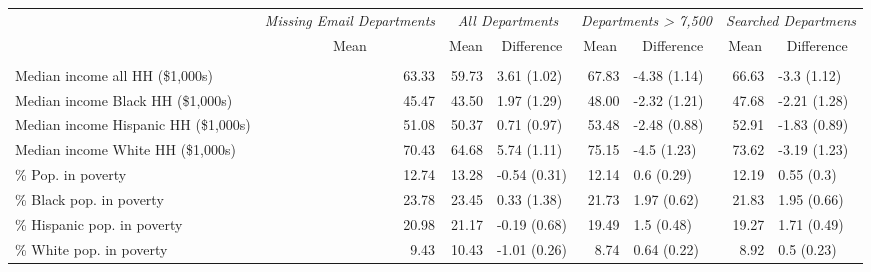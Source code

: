 \begin{table}
\centering
\begin{tabular}[t]{lrrlrlrl}
\toprule
\multicolumn{1}{c}{\em{}} & \multicolumn{1}{c}{\em{Missing Email Departments}} & \multicolumn{2}{c}{\em{All Departments}} & \multicolumn{2}{c}{\em{Departments > 7,500}} & \multicolumn{2}{c}{\em{Searched Departmens}} \\
\cmidrule(l{3pt}r{3pt}){2-2} \cmidrule(l{3pt}r{3pt}){3-4} \cmidrule(l{3pt}r{3pt}){5-6} \cmidrule(l{3pt}r{3pt}){7-8}
\multicolumn{1}{c}{} & \multicolumn{1}{c}{Mean} & \multicolumn{1}{c}{Mean} & \multicolumn{1}{c}{Difference} & \multicolumn{1}{c}{Mean} & \multicolumn{1}{c}{Difference} & \multicolumn{1}{c}{Mean} & \multicolumn{1}{c}{Difference} \\
\cmidrule(l{3pt}r{3pt}){2-2} \cmidrule(l{3pt}r{3pt}){3-3} \cmidrule(l{3pt}r{3pt}){4-4} \cmidrule(l{3pt}r{3pt}){5-5} \cmidrule(l{3pt}r{3pt}){6-6} \cmidrule(l{3pt}r{3pt}){7-7} \cmidrule(l{3pt}r{3pt}){8-8}
\addlinespace[0.3em]
\multicolumn{8}{l}{\textbf{Income (county-level)}}\\
\hspace{1em}Median income all HH (\$1,000s) & 63.33 & 59.73 & 3.61 (1.02) & 67.83 & -4.38 (1.14) & 66.63 & -3.3 (1.12)\\
\hspace{1em}Median income Black HH (\$1,000s) & 45.47 & 43.50 & 1.97 (1.29) & 48.00 & -2.32 (1.21) & 47.68 & -2.21 (1.28)\\
\hspace{1em}Median income Hispanic HH (\$1,000s) & 51.08 & 50.37 & 0.71 (0.97) & 53.48 & -2.48 (0.88) & 52.91 & -1.83 (0.89)\\
\hspace{1em}Median income White HH (\$1,000s) & 70.43 & 64.68 & 5.74 (1.11) & 75.15 & -4.5 (1.23) & 73.62 & -3.19 (1.23)\\
\hspace{1em}\% Pop. in poverty & 12.74 & 13.28 & -0.54 (0.31) & 12.14 & 0.6 (0.29) & 12.19 & 0.55 (0.3)\\
\hspace{1em}\% Black pop. in poverty & 23.78 & 23.45 & 0.33 (1.38) & 21.73 & 1.97 (0.62) & 21.83 & 1.95 (0.66)\\
\hspace{1em}\% Hispanic pop. in poverty & 20.98 & 21.17 & -0.19 (0.68) & 19.49 & 1.5 (0.48) & 19.27 & 1.71 (0.49)\\
\hspace{1em}\% White pop. in poverty & 9.43 & 10.43 & -1.01 (0.26) & 8.74 & 0.64 (0.22) & 8.92 & 0.5 (0.23)\\

\end{tabular}
\end{table}
